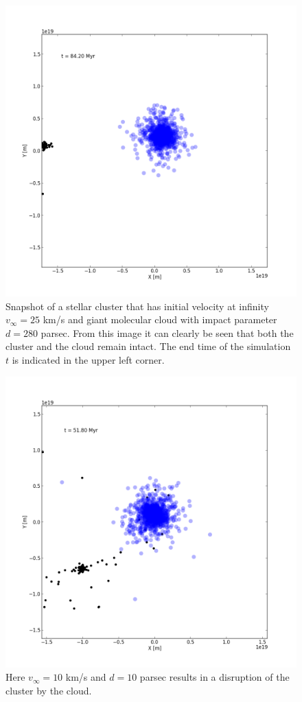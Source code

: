 \documentclass{aa}
\begin{document}
\begin{figure}
    \centering
    \includegraphics[width=\hsize]{img/v_25_d_280.png}
    \caption{Snapshot of a stellar cluster that has initial velocity at infinity $v_\infty = 25$ km/s and giant molecular cloud with impact parameter $d = 280$ parsec. From this image it can clearly be seen that both the cluster and the cloud remain intact. The end time of the simulation $t$ is indicated in the upper left corner.}\label{fig:v_25_d_280}
\end{figure}
\begin{figure}
    \centering
    \includegraphics[width=\hsize]{img/v_10_d_10.png}
    \caption{Here $v_\infty = 10$ km/s and $d = 10$ parsec results in a disruption of the cluster by the cloud.}\label{fig:v_10_d_10}
\end{figure}
\end{document}
